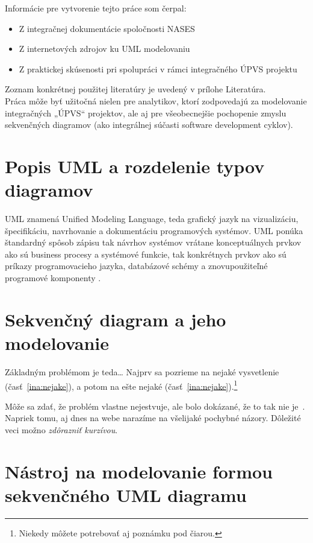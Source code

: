\documentclass[10pt,twoside,slovak,a4paper]{article}
\begin{document}
Informácie pre vytvorenie tejto práce som čerpal:

\begin{itemize}
\item Z integračnej dokumentácie spoločnosti NASES
\item Z internetových zdrojov ku UML modelovaniu
\item Z praktickej skúsenosti pri spolupráci v rámci integračného ÚPVS projektu
\end{itemize}
Zoznam konkrétnej použitej literatúry je uvedený v prílohe Literatúra.\\

Práca môže byť užitočná nielen pre analytikov, ktorí zodpovedajú za modelovanie integračných „ÚPVS“ projektov, ale aj pre všeobecnejšie pochopenie zmyslu sekvenčných diagramov (ako integrálnej súčasti software development cyklov).


\section{Popis UML a rozdelenie typov diagramov} \label{Popis}

UML znamená Unified Modeling Language, teda grafický jazyk na vizualizáciu, špecifikáciu, navrhovanie a dokumentáciu programových systémov. UML ponúka štandardný spôsob zápisu tak návrhov systémov vrátane konceptuálnych prvkov ako sú business procesy a systémové funkcie, tak konkrétnych prvkov ako sú príkazy programovacieho jazyka, databázové schémy a znovupoužiteľné programové komponenty\cite{WIKI, SEQ} .




\section{Sekvenčný diagram a jeho modelovanie} \label{Sekvenčný}

Základným problémom je teda\ldots{} Najprv sa pozrieme na nejaké vysvetlenie (časť~\ref{ina:nejake}), a potom na ešte nejaké (časť~\ref{ina:nejake}).\footnote{Niekedy môžete potrebovať aj poznámku pod čiarou.}

Môže sa zdať, že problém vlastne nejestvuje\cite{Coplien:MPD}, ale bolo dokázané, že to tak nie je~\cite{Czarnecki:Staged, Czarnecki:Progress}. Napriek tomu, aj dnes na webe narazíme na všelijaké pochybné názory\cite{PLP-Framework}. Dôležité veci možno \emph{zdôrazniť kurzívou}.


\section{Nástroj na modelovanie formou sekvenčného UML diagramu} \label{Nástroj}
\end{document}
